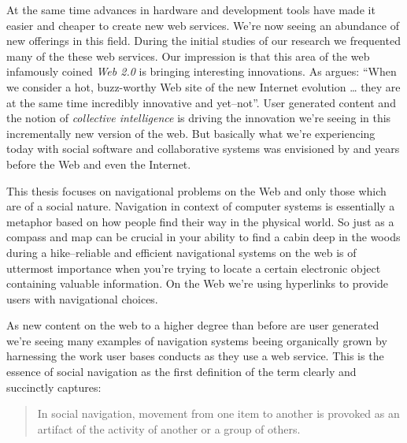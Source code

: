 At the same time advances in hardware and development tools have made it
easier and cheaper to create new web services. We're now seeing an
abundance of new offerings in this field.
During the initial studies of our research we frequented
many of the these web services. Our impression is that
this area of the web infamously coined \emph{Web 2.0}%
is bringing interesting innovations. As \citet[p.~18]{weiss05} argues:
``When we consider a hot, buzz-worthy Web site of the new Internet evolution
\ldots
they are at the same time incredibly innovative and yet--not''.
User generated content and the notion of \emph{collective intelligence} is
driving the innovation we're seeing in this incrementally new version of the
web. But basically what we're experiencing today with social software and
collaborative systems was envisioned by \citet{bush45} and
\citet{licklider68} years before the Web and even the Internet.

This thesis focuses on navigational problems on the Web and only those
which are of a social nature. Navigation in context of computer systems is
essentially a metaphor based on how people find their way in the physical
world. So just as a compass and map can be crucial in your ability to find a
cabin deep in the woods during a hike--reliable and efficient navigational
systems on the web is of uttermost importance when you're trying to locate a
certain electronic object containing valuable information. On the Web we're
using hyperlinks \citep[p.~90]{nelson65} to provide users with navigational
choices.

As new content on the web to a higher degree than before are user generated
we're seeing many examples of navigation systems beeing organically
grown by harnessing the work user bases conducts as they use a web service.
This is the essence of social navigation as the first definition of the term
clearly and succinctly captures:

\begin{quote}
In social navigation, movement from one item to another is provoked as an
artifact of the activity of another or a group of others. \citep{dourish94} 
\end{quote}

